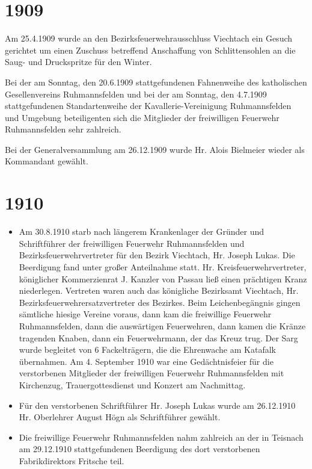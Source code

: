 \documentclass[12pt,a4paper]{book}
\begin{document}
\section*{1909}

Am 25.4.1909 wurde an den Bezirksfeuerwehrausschluss Viechtach ein Gesuch
gerichtet um einen Zuschuss betreffend Anschaffung von Schlittensohlen an die
Saug- und Druckspritze für den Winter.

Bei der am Sonntag, den 20.6.1909 stattgefundenen Fahnenweihe des katholischen
Gesellenvereins Ruhmannsfelden und bei der am Sonntag, den 4.7.1909
stattgefundenen Standartenweihe der Kavallerie-Vereinigung Ruhmannsfelden und
Umgebung beteiligenten sich die Mitglieder der freiwilligen Feuerwehr
Ruhmannsfelden sehr zahlreich.

Bei der Generalversammlung am 26.12.1909 wurde Hr. Alois Bielmeier wieder als
Kommandant gewählt.

\section*{1910}

\begin{itemize}
\item Am 30.8.1910 starb nach längerem Krankenlager der Gründer und
Schriftführer der freiwilligen Feuerwehr Ruhmannsfelden und
Bezirksfeuerwehrvertreter für den Bezirk Viechtach, Hr. Joseph Lukas. Die
Beerdigung fand unter großer Anteilnahme statt. Hr. Kreisfeuerwehrvertreter,
königlicher Kommerzienrat J. Kanzler von Passau ließ einen prächtigen Kranz
niederlegen. Vertreten waren auch das königliche Bezirksamt Viechtach, Hr.
Bezirksfeuerwehrersatzvertreter des Bezirkes. Beim Leichenbegängnis gingen
sämtliche hiesige Vereine voraus, dann kam die freiwillige Feuerwehr
Ruhmannsfelden, dann die auswärtigen Feuerwehren, dann kamen die Kränze
tragenden Knaben, dann ein Feuerwehrmann, der das Kreuz trug. Der Sarg wurde
begleitet von 6 Fackelträgern, die die Ehrenwache am Katafalk übernahmen. Am 4.
September 1910 war eine Gedächtnisfeier für die verstorbenen Mitglieder der
freiwilligen Feuerwehr Ruhmannsfelden mit Kirchenzug, Trauergottesdienst und
Konzert am Nachmittag.

\item Für den verstorbenen Schriftführer Hr. Joseph Lukas wurde am 26.12.1910
Hr. Oberlehrer August Högn als Schriftführer gewählt.

\item Die freiwillige Feuerwehr Ruhmannsfelden nahm zahlreich an der in Teisnach
am 29.12.1910 stattgefundenen Beerdigung des dort verstorbenen Fabrikdirektors
Fritsche teil.
\end{itemize}
\end{document}

